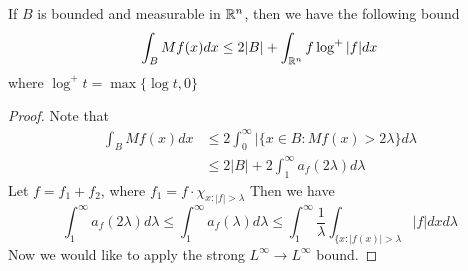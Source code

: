 \begin{theorem}
    If $B$ is bounded and measurable in $\mathbb{R}^n$, then we have the following bound
    \begin{equation*}
        \int_BMf(x)dx\leq 2|B|+\int_{\mathbb{R}^n}f\log^+|f|dx
    \end{equation*}
    where $\log^+t=\max{\{\log t, 0\}}$
\end{theorem}
\begin{proof}
    Note that
    \begin{align*}
        \int_BMf(x)dx&\leq 2\int_0^\infty|\{x\in B: Mf(x)>2\lambda\}d\lambda\\
        &\leq 2|B|+2\int_1^\infty a_f(2\lambda)d\lambda
    \end{align*}
    Let $f=f_1+f_2$, where $f_1=f\cdot\chi_{x:|f|>\lambda}$
    Then we have
    \begin{equation*}
        \int_1^\infty a_f(2\lambda)d\lambda\leq \int_1^\infty a_f(\lambda)d\lambda\leq\int_1^\infty\frac{1}{\lambda}\int_{\{x: |f(x)|>\lambda}|f|dxd\lambda
    \end{equation*}
    Now we would like to apply the strong $L^\infty\to L^\infty$ bound.
\end{proof}

